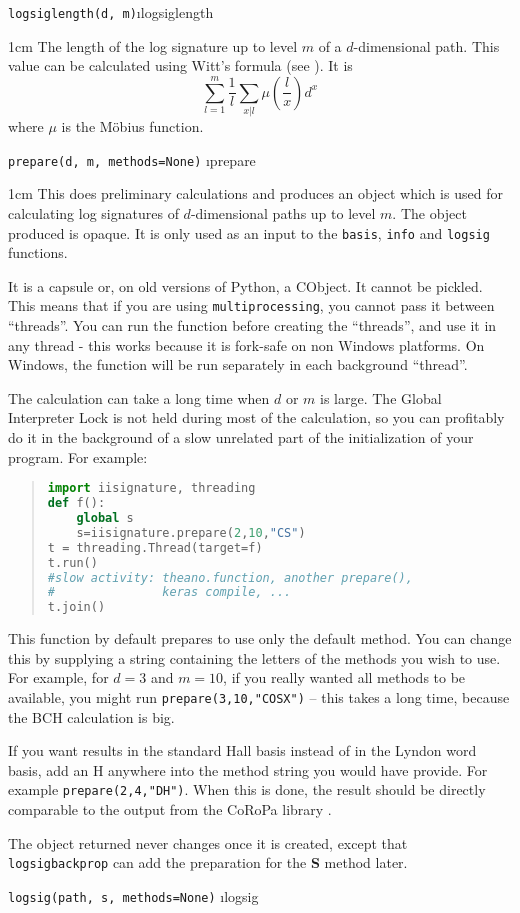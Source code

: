 \documentclass[a4paper]{extarticle}
\newenvironment{defn}{\begin{adjustwidth}{1cm}{}\ignorespaces}{\end{adjustwidth}\ignorespacesafterend}
\begin{document}
\verb!logsiglength(d, m)!\i{logsiglength}
\begin{defn}
The length of the log signature up to level $m$ of a $d$-dimensional path. This value can be calculated using Witt's formula (see \cite{wikinecklace}). It is
\[\sum_{l=1}^m \frac1l\sum_{x|l}\mu\left(\frac{l}{x}\right)d^x\]
where $\mu$ is the M\"obius function.
\end{defn}

\verb!prepare(d, m, methods=None)! \i{prepare}
\nopagebreak \begin{defn}\nopagebreak 
This does preliminary calculations and produces an object which is used for calculating log signatures of $d$-dimensional paths up to level $m$. The object produced is opaque. It is only used as an input to the \verb|basis|, \verb|info| and \verb|logsig| functions. 

It is a capsule or, on old versions of Python, a CObject. It cannot be pickled. This means that if you are using \verb|multiprocessing|, you cannot pass it between ``threads''. You can run the function before creating the ``threads'', and use it in any thread - this works because it is fork-safe on non Windows platforms. On Windows, the function will be run separately in each background ``thread''.

The calculation can take a long time when $d$ or $m$ is large. The Global Interpreter Lock is not held during most of the calculation, so you can profitably do it in the background of a slow unrelated part of the initialization of your program. For example:
\begin{quotation}
\begin{lstlisting}[language=Python,keywordstyle=\bf]
import iisignature, threading
def f():
	global s
	s=iisignature.prepare(2,10,"CS")
t = threading.Thread(target=f)
t.run()
#slow activity: theano.function, another prepare(), 
#               keras compile, ...
t.join()
\end{lstlisting}
\end{quotation}

This function by default prepares to use only the default method. You can change this by supplying a string containing the letters of the methods you wish to use. For example, for $d=3$ and $m=10$, if you really wanted all methods to be available, you might run \verb|prepare(3,10,"COSX")| -- this takes a long time, because the BCH calculation is big. 

If you want results in the standard Hall basis instead of in the Lyndon word basis, add an H anywhere into the method string you would have provide. For example \verb|prepare(2,4,"DH")|. When this is done, the result should be directly comparable to the output from the CoRoPa library \cite{coropa}.

The object returned never changes once it is created, except that \verb!logsigbackprop! can add the preparation for the \textbf{S} method later.

\end{defn}
\verb!logsig(path, s, methods=None)! \i{logsig}
\end{document}

